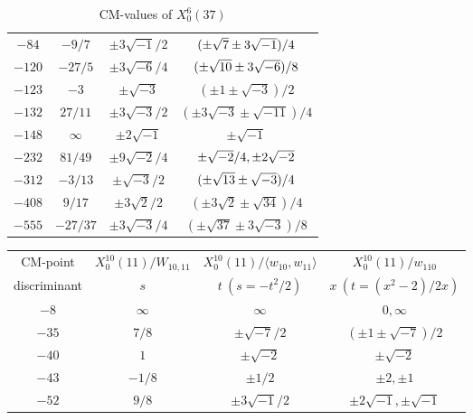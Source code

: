 \documentclass{amsart}
\theoremstyle{definition}
\begin{document}
\begin{appendices}
\begin{table}
\begin{tabular}{|c|c|c|c|}
${-84}$ & $-{9}/{7}$ & $\pm{ 3\sqrt{-1}}/{2}$ & $(\pm \sqrt{7}\pm 3\sqrt{-1})/{%
4}$ \\ 
${-120}$ & $-{27}/{5}$ & $\pm{ 3\sqrt{-6}}/{4}$ & $(\pm \sqrt{%
10}\pm 3\sqrt{-6})/{8}$ \\
${-123}$ & $-3$ & $\pm\sqrt{-3}$ & $(\pm 1\pm \sqrt{-3})/{2}
$ \\ 
${-132}$ & ${27}/{11}$ & $\pm{ 3\sqrt{-3}}/{2}$ & $(\pm 3%
\sqrt{-3}\pm \sqrt{-11})/{4}$ \\ 

${-148}$ & $\infty$ & $\pm2\sqrt{-1}$ & $\pm\sqrt{-1}$ \\
${-232}$ & ${81}/{49}$ & $\pm{ 9\sqrt{-2}}/{4}$ & $\pm{ \sqrt{%
-2}}/{4},\pm 2\sqrt{-2}$ \\ 
${-312}$ & $-{3}/{13}$ & $\pm{ \sqrt{-3}}/{2}$ & $(\pm \sqrt{%
13}\pm \sqrt{-3})/{4}$ \\ 
${-408}$ & ${9}/{17}$ & $\pm{ 3\sqrt{2}}/{2}$ & $(\pm 3\sqrt{2%
}\pm \sqrt{34})/{4}$ \\ 
${-555}$ & $-{27}/{37}$ & $\pm{ 3\sqrt{-3}}/{4}$ & $(\pm 
\sqrt{37}\pm 3\sqrt{-3})/{8}$ \\ \hline
\end{tabular}

\bigskip
\caption{CM-values of $X^{6}_0(37)$}
\end{table}

\renewcommand{\arraystretch}{1.5}
\tabcolsep=10pt                         
\begin{table}
\begin{tabular}{|c|c|c|c|}
\hline
CM-point& $X_{0}^{10}\left( 11\right) /W_{10,11}$ & $X_{0}^{10}\left( 11\right)
/\langle w_{10},w_{11}\rangle$ & $X_{0}^{10}\left( 11\right) /w_{110}$ \\
discriminant & $s$ & $t\ (s={-t^2}/{2})$ & $x\ (t=(x^2-2)/{2x})$ \\ \hline
${-8}$ & $\infty $ & $\infty $ & $0,\infty $ \\
${-35}$ & ${7}/{8}$ & $\pm{ \sqrt{-7}}/{2}$ & $(\pm 1\pm 
\sqrt{-7})/{2}$ \\ 
${-40}$ & $1$ & $\pm \sqrt{-2}$ & $\pm \sqrt{-2}$ \\ 
${-43}$ & $-{1}/{8}$ & $\pm{ 1}/{2}$ & $\pm 2,\pm 1$ \\ 
${-52}$ & ${9}/{8}$ & $\pm{ 3\sqrt{-1}}/{2}$ & $\pm 2\sqrt{-1},\pm \sqrt{-1}$ \\ 


\end{tabular}
\end{table}
\end{appendices}
\end{document}
